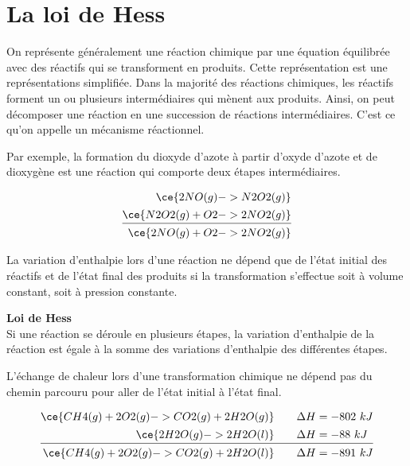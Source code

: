 \documentclass[
  11pt,
  a4paper,
  openany]{book}
\begin{document}
\hypertarget{la-loi-de-hess}{%
\section{La loi de Hess}\label{la-loi-de-hess}}

On représente généralement une réaction chimique par une équation équilibrée avec des réactifs qui se transforment en produits. Cette représentation est une représentations simplifiée. Dans la majorité des réactions chimiques, les réactifs forment un ou plusieurs intermédiaires qui mènent aux produits. Ainsi, on peut décomposer une réaction en une succession de réactions intermédiaires. C'est ce qu'on appelle un mécanisme réactionnel.

Par exemple, la formation du dioxyde d'azote à partir d'oxyde d'azote et de dioxygène est une réaction qui comporte deux étapes intermédiaires.

\[
\begin{split}
\ce{2 NO(g) -> N2O2(g)} \\[0.1em]
\ce{N2O2(g) + O2 -> 2NO2(g)} \\[0.1em]
\hline\\[-1.2em]
\ce{2 NO(g) + O2 -> 2NO2(g)}
\end{split}
\]

La variation d'enthalpie lors d'une réaction ne dépend que de l'état initial des réactifs et de l'état final des produits si la transformation s'effectue soit à volume constant, soit à pression constante.

\begin{tcolorbox}
\textbf{Loi de Hess}\\
Si une réaction se déroule en plusieurs étapes, la variation d'enthalpie de la réaction est égale à la somme des variations d'enthalpie des différentes étapes.

\end{tcolorbox}

L'échange de chaleur lors d'une transformation chimique ne dépend pas du chemin parcouru pour aller de l'état initial à l'état final.

\[
\begin{split}
\ce{CH4(g) + 2 O2(g) -> CO2(g) + 2 H2O(g)} \qquad \Delta H &= -802\ kJ \\[0.1em]
\ce{2 H2O(g) -> 2 H2O(l)} \qquad \Delta H &= -88\ kJ \\[0.1em]
\hline\\[-1.2em]
\ce{CH4(g) + 2 O2(g) -> CO2(g) + 2 H2O(l)} \qquad \Delta H &= -891\ kJ
\end{split}
\]
\end{document}
